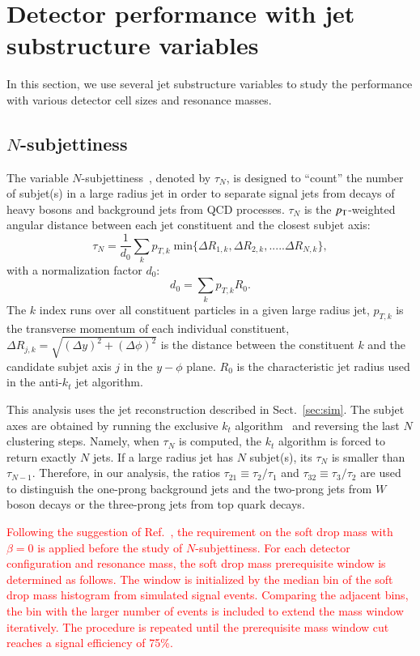 \section{Detector performance with jet substructure variables}\label{sec:Jsubvar}
In this section, we use several jet substructure variables to study the performance with various detector cell sizes and resonance masses.

\subsection{$N$-subjettiness \label{sec:nsub}}
The variable $N$-subjettiness~\cite{Thaler:2010tr}, denoted by $\tau_N$, is designed to 
``count'' the number of subjet(s) in a large radius jet in order to separate 
signal jets from decays of heavy bosons and background jets from QCD processes. 
 $\tau_N$ is the $p_{\mathrm{T}}$-weighted angular distance between each jet 
constituent and the closest subjet axis: 
\begin{equation}\label{eq:Nsub_1}
\tau_{N}=\frac{1}{d_{0}}\sum_{k}p_{T,k} \; \mathrm{min}\{\Delta R_{1,k},\Delta R_{2,k},.....\Delta R_{N,k}\},
\end{equation}
with a normalization factor $d_0$: \[d_{0}=\sum_{k}p_{T,k} R_{0}.\] 
The $k$ index runs over all constituent particles in a given large radius jet, 
$p_{T,k}$ is the transverse momentum of each individual constituent, 
$\Delta R_{j,k}=\sqrt{(\Delta y)^{2}+(\Delta \phi)^{2}}$ is the distance 
between the constituent $k$ and the candidate subjet axis $j$ in the 
$y-\phi$ plane. $R_{0}$ is the characteristic jet radius used in 
the anti-$k_t$ jet algorithm. 

This analysis uses the jet reconstruction described in Sect.~\ref{sec:sim}. 
The subjet axes are obtained by running the 
exclusive $k_{t}$ algorithm~\cite{Catani:246812} and reversing the last $N$ clustering steps. 
Namely, when $\tau_N$ is computed, the $k_{t}$ algorithm is forced to return 
exactly $N$ jets. If a large radius jet has $N$ subjet(s), its $\tau_{N}$ is 
smaller than $\tau_{N-1}$. Therefore, in our analysis, 
the ratios $\tau_{21} \equiv \tau_{2}/\tau_{1}$ and $\tau_{32} \equiv \tau_{3}/\tau_{2}$ 
are used to distinguish the one-prong background jets and 
the two-prong jets from $W$ boson decays or the three-prong jets from top quark decays. 

\textcolor{red}{Following the suggestion of Ref.~\cite{Dreyer:2018tjj}, the requirement on the 
soft drop mass with $\beta=0$ is applied before the study of $N$-subjettiness. 
For each detector configuration and resonance mass, the soft drop mass prerequisite window  
is determined as follows. The window is initialized by the median bin of the soft drop 
mass histogram from simulated signal events. Comparing the adjacent bins, the bin with the larger number of events is included to extend the mass window iteratively. The procedure is 
repeated until the prerequisite mass window cut reaches a signal  efficiency of 75\%.} 

